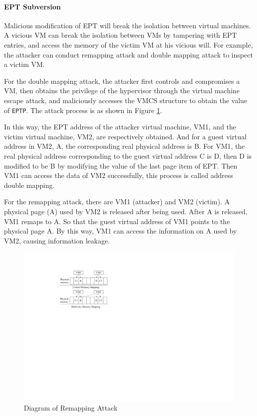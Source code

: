 \paragraph{EPT Subversion}
Malicious modification of EPT will break the isolation between virtual machines. A vicious VM can break the isolation between VMs by tampering with EPT entries, and access the memory of the victim VM at his vicious will. For example, the attacker can conduct remapping attack and double mapping attack to inspect a victim VM. 

For the double mapping attack, the attacker first controls and compromises a VM, then obtains the privilege of the hypervisor through the virtual machine escape attack, and maliciously accesses the VMCS structure to obtain the value of \verb|EPTP|. The attack process is as shown in Figure \ref{pic:remap}. 

In this way, the EPT address of the attacker virtual machine, VM1, and the victim virtual machine, VM2, are respectively obtained. And for a guest virtual address in VM2, A, the corresponding real physical address is B. For VM1, the real physical address corresponding to the guest virtual address C is D, then D is modified to be B by modifying the value of the last page item of EPT. Then VM1 can access the data of VM2 successfully, this process is called address double mapping.

For the remapping attack, there are VM1 (attacker) and VM2 (victim). A physical page (A) used by VM2 is released after being used. After A is released, VM1 remaps to A. So that the guest virtual address of VM1 points to the physical page A. By this way, VM1 can access the information on A used by VM2, causing information leakage.


\begin{figure}
    \centering
    \includegraphics{IMG/remap.pdf}
    \caption{Diagram of Remapping Attack}
    \label{pic:remap}
\end{figure}

